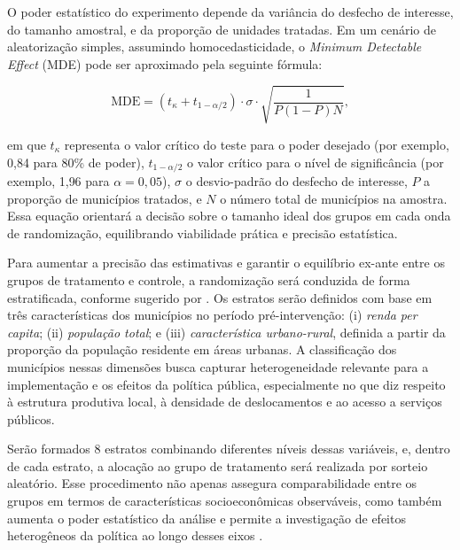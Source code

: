 O poder estatístico do experimento depende da variância do desfecho de interesse, do tamanho amostral, e da proporção de unidades tratadas. Em um cenário de aleatorização simples, assumindo homocedasticidade, o \textit{Minimum Detectable Effect} (MDE) pode ser aproximado pela seguinte fórmula:

\begin{equation}
    \text{MDE} = (t_{\kappa} + t_{1 - \alpha/2}) \cdot \sigma \cdot \sqrt{\frac{1}{P(1 - P)N}},
\end{equation}

em que $t_{\kappa}$ representa o valor crítico do teste para o poder desejado (por exemplo, 0{,}84 para 80\% de poder), $t_{1 - \alpha/2}$ o valor crítico para o nível de significância (por exemplo, 1{,}96 para $\alpha = 0{,}05$), $\sigma$ o desvio-padrão do desfecho de interesse, $P$ a proporção de municípios tratados, e $N$ o número total de municípios na amostra. Essa equação orientará a decisão sobre o tamanho ideal dos grupos em cada onda de randomização, equilibrando viabilidade prática e precisão estatística.


Para aumentar a precisão das estimativas e garantir o equilíbrio ex-ante entre os grupos de tratamento e controle, a randomização será conduzida de forma estratificada, conforme sugerido por \cite{duflo2008toolkit}. Os estratos serão definidos com base em três características dos municípios no período pré-intervenção: (i) \textit{renda per capita}; (ii) \textit{população total}; e (iii) \textit{característica urbano-rural}, definida a partir da proporção da população residente em áreas urbanas. A classificação dos municípios nessas dimensões busca capturar heterogeneidade relevante para a implementação e os efeitos da política pública, especialmente no que diz respeito à estrutura produtiva local, à densidade de deslocamentos e ao acesso a serviços públicos.

Serão formados 8 estratos combinando diferentes níveis dessas variáveis, e, dentro de cada estrato, a alocação ao grupo de tratamento será realizada por sorteio aleatório. Esse procedimento não apenas assegura comparabilidade entre os grupos em termos de características socioeconômicas observáveis, como também aumenta o poder estatístico da análise e permite a investigação de efeitos heterogêneos da política ao longo desses eixos \cite{glewwe2022impact, angrist2009mostly}.

